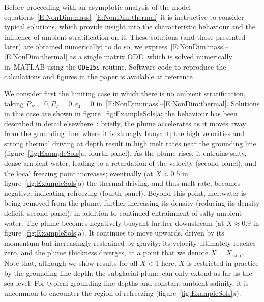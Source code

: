 \documentclass[openacc]{rsproca_new}%
\newcommand{\epsfour}{\epsilon_{4}}
\newcommand{\Pb}{\textit{P}_B}  %
\newcommand{\Pt}{\textit{P}_T}
\begin{document}
Before proceeding with an asymptotic analysis of the model equations~\eqref{E:NonDim:mass}--\eqref{E:NonDim:thermal} it is instructive to consider typical solutions, which provide insight into the characteristic behaviour and the influence of ambient stratification on it. These solutions (and those presented later) are obtained numerically; to do so, we express~\eqref{E:NonDim:mass}--\eqref{E:NonDim:thermal} as a single matrix ODE, which is solved numerically in~\textsc{MATLAB} using the \texttt{ODE15s} routine. Software code to reproduce the calculations and figures in the paper is available at reference~\cite{PycnoclineCode}.

We consider first the limiting case in which there is no ambient stratification, taking $\Pb = 0, \Pt = 0, \epsfour = 0$ in~\eqref{E:NonDim:mass}--\eqref{E:NonDim:thermal}. Solutions in this case are shown in figure~\ref{fig:ExampleSols}a; the behaviour has been described in detail elsewhere~\cite[see][for example]{Jenkins1991JGeophysResOceans, Jenkins2011JPhysOcean, Magorrian2016JGeoResOcean, Hewitt2020AnnRevFlu}: briefly, the plume accelerates as it moves away from the grounding line, where it is strongly buoyant; the high velocities and strong thermal driving at depth result in high melt rates near the grounding line (figure~\ref{fig:ExampleSols}a, fourth panel). As the plume rises, it entrains salty, dense ambient water, leading to a retardation of the velocity (second panel), and the local freezing point increases; eventually (at $X \approx 0.5$ in figure~\ref{fig:ExampleSols}a) the thermal driving, and thus melt rate, becomes negative, indicating refreezing (fourth panel). Beyond this point, meltwater is being removed from the plume, further increasing its density (reducing its density deficit, second panel), in addition to continued entrainment of salty ambient water. The plume becomes negatively buoyant further downstream (at $X \approx 0.9$ in figure~\ref{fig:ExampleSols}a). It continues to move upwards, driven by its momentum but increasingly restrained by gravity; its velocity ultimately reaches zero, and the plume thickness diverges, at a point that we denote $X = X_{\text{stop}}$. Note that, although we show results for all $X < 1$ here, $X$ is restricted in practice by the grounding line depth: the subglacial plume can only extend as far as the sea level. For typical grounding line depths and constant ambient salinity, it is uncommon to encounter the region of refreezing (figure~\ref{fig:ExampleSols}a). 
\end{document}
